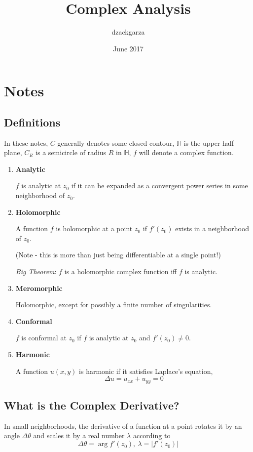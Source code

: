 \documentclass{article}
\title{Complex Analysis}
\author{dzackgarza }
\date{June 2017}
\begin{document}
\section{Notes}

\subsection{Definitions}

In these notes, $C$ generally denotes some closed contour, $\mathbb{H}$ is the upper half-plane, $C_R$ is a semicircle of radius $R$ in $\mathbb{H}$, $f$ will denote a complex function.


\begin{enumerate}
   \item \textbf{Analytic}
   
   $f$ is analytic at $z_0$ if it can be expanded as a convergent power series in some neighborhood of $z_0$.
   
   \item \textbf{Holomorphic}
   
   A function $f$ is holomorphic at a point $z_0$ if $f'(z_0)$ exists in a neighborhood of $z_0$.
   
   (Note - this is more than just being differentiable at a single point!)
   
   \textit{Big Theorem}: $f$ is a holomorphic complex function iff $f$ is analytic.
   
   \item \textbf{Meromorphic}
   
   Holomorphic, except for possibly a finite number of singularities.
   
   \item \textbf{Conformal}
   
   $f$ is conformal at $z_0$ if $f$ is analytic at $z_0$ and $f'(z_0) \neq 0$.
   
   \item \textbf{Harmonic}
   
   A function $u(x,y)$ is harmonic if it satisfies Laplace's equation, \[\Delta u = u_{xx} + u_{yy} = 0\]
\end{enumerate}

\subsection{What is the Complex Derivative?}

In small neighborhoods, the derivative of a function at a point rotates it by an angle $\Delta\theta$ and scales it by a real number $\lambda$  according to
\[\Delta\theta = \arg f'(z_0), ~\lambda = |f'(z_0)|\]
\end{document}

